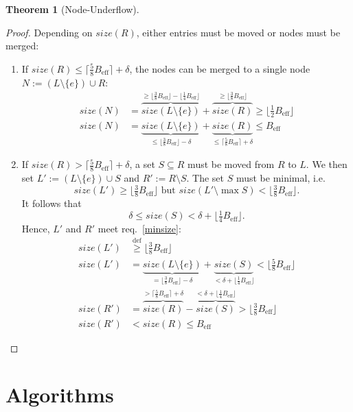 \documentclass[a4paper, 8pt]{scrartcl}
\theoremstyle{plain}
\theoremstyle{definition}
\newtheorem{thm}{Theorem}[section]
\theoremstyle{remark}
\newcommand \Beff { B_{\text{eff}} }
\begin{document}
\begin{multicols}{2}
\begin{thm}[Node-Underflow]
\begin{proof}
Depending on $size(R)$, either entries must be moved or nodes must be merged:
\begin{enumerate}
\item If \mbox{$size(R) \leq \lceil \frac{5}{8} \Beff \rceil + \delta$},
the nodes can be merged to a single node
\mbox{$N := (L \setminus \{e\}) \cup R$}:
\begin{align*}
size(N)
	&= \overbrace{size(L \setminus \{e\})}^{
			\geq \lfloor \frac{3}{8} \Beff \rfloor 
				- \lfloor \frac{1}{4} \Beff \rfloor}
		+ \overbrace{size(R)}^{
			\geq \lfloor \frac{3}{8} \Beff \rfloor}
	\geq \lfloor \tfrac{1}{2} \Beff \rfloor\\
size(N)
	&= \underbrace{size(L \setminus \{e\})}_{
			\leq \lfloor \frac{3}{8} \Beff \rfloor - \delta}
		+ \underbrace{size(R)}_{
			\leq \lceil \frac{5}{8} \Beff \rceil + \delta}
	\leq \Beff
\end{align*}

\item
If \mbox{$size(R) > \lceil \frac{5}{8} \Beff \rceil + \delta$}, a set
\mbox{$S \subseteq R$} must be moved from $R$ to $L$.
We then set \mbox{$L' := (L \setminus \{e\}) \cup S$} and
\mbox{$R' := R \setminus S$}.
The set $S$ must be minimal, i.e.
\[ size(L') \geq \lfloor \tfrac{3}{8} \Beff \rfloor \text{ but }
	size(L' \setminus \max S) < \lfloor \tfrac{3}{8} \Beff \rfloor. \]
It follows that
\[ \delta \leq size(S) < \delta + \lfloor \tfrac{1}{4} \Beff \rfloor. \]
Hence, $L'$ and $R'$ meet req.~\ref{minsize}:
\begin{align*}
size(L')
	&\stackrel{\mathrm{def}}{\geq} \lfloor \tfrac{3}{8} \Beff \rfloor\\
size(L')
	&= \underbrace{size(L \setminus \{e\})}_{
			= \lfloor \frac{3}{8} \Beff \rfloor - \delta}
		+ \underbrace{size(S)}_{
			< \delta + \lfloor \frac{1}{4} \Beff \rfloor}
	< \lfloor \tfrac{5}{8} \Beff \rfloor\\
size(R')
	&= \overbrace{size(R)}^{
			> \lceil \frac{5}{8} \Beff \rceil + \delta}
		- \overbrace{size(S)}^{
			< \delta + \lfloor \frac{1}{4} \Beff \rfloor}
	> \lfloor \tfrac{3}{8} \Beff \rfloor\\
size(R')
	&< size(R) \leq \Beff
\end{align*}
\end{enumerate}
\end{proof}
\end{thm}



\section{Algorithms} %


\end{multicols}
\end{document}
